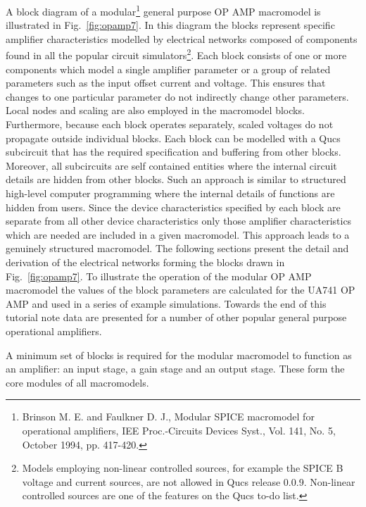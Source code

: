 A block diagram of a modular\footnote{Brinson M. E. and Faulkner D. J., Modular SPICE macromodel for operational amplifiers, IEE Proc.-Circuits Devices Syst., Vol. 141, No. 5, October 1994, pp. 417-420.} general purpose OP AMP macromodel is illustrated in Fig.~\ref{fig:opamp7}.  In this diagram the blocks represent specific amplifier characteristics modelled by electrical networks composed of components found in all the popular circuit simulators\footnote{Models employing non-linear controlled sources, for example the SPICE B voltage and current sources, are not allowed in Qucs release 0.0.9. Non-linear controlled sources are one of the features on the Qucs to-do list.}. Each block consists of one or more components which model a single amplifier parameter or a group of related parameters such as the input offset current and voltage.  This ensures that changes to one particular parameter do not indirectly change other parameters.  Local nodes and scaling are also employed in the macromodel blocks.  Furthermore, because each block operates separately, scaled voltages do not propagate outside individual blocks. Each block can be modelled with a Qucs subcircuit that has the required specification and buffering from other blocks.  Moreover, all subcircuits are self contained entities where the internal circuit details are hidden from other blocks.  Such an approach is similar to structured high-level computer programming where the internal details of functions are hidden from users.   Since the device characteristics specified by each block are separate from all other device characteristics only those amplifier characteristics which are needed are included in a given macromodel. This approach leads to a genuinely structured macromodel.  The following sections present the detail and derivation of the electrical networks forming the blocks drawn in Fig.~\ref{fig:opamp7}. To illustrate the operation of the modular OP AMP macromodel the values of the block parameters are calculated for the UA741 OP AMP and used in a series of example simulations.  Towards the end of this tutorial note data are presented for a number of other popular general purpose operational amplifiers.

A minimum set of blocks is required for the modular macromodel to function as an amplifier: an input stage, a gain stage and an output stage.  These form the core modules of all macromodels.  

